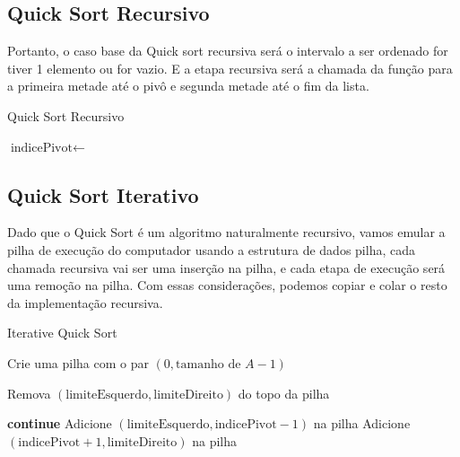 \subsection{Quick Sort Recursivo}

Portanto, o caso base da Quick sort recursiva será o intervalo a ser ordenado for tiver 1 elemento ou for vazio. E a etapa recursiva será a chamada da função para a primeira metade até o pivô e segunda metade até o fim da lista.

\begin{algorithm}
	\caption{Quick Sort Recursivo}
	\label{algo:rec_quick_sort}
	\begin{algorithmic}[1]
		\Return
		\EndIf
		\State $\text{indicePivot} \gets$ 
		\State {}
		\State {}
		\EndFunction
	\end{algorithmic}
\end{algorithm}
\FloatBarrier

\subsection{Quick Sort Iterativo}

Dado que o Quick Sort é um algoritmo naturalmente recursivo, vamos emular a pilha de execução do computador usando a estrutura de dados pilha, cada chamada recursiva vai ser uma inserção na pilha, e cada etapa de execução será uma remoção na pilha. Com essas considerações, podemos copiar e colar o resto da implementação recursiva.

\begin{algorithm}
	\caption{Iterative Quick Sort}
	\label{algo:iterative_quick_sort}
	\begin{algorithmic}[1]
		\Statex

		\State \Return
		\EndIf
		\State Crie uma pilha com o par $(0, \text{tamanho de } A - 1)$

		\State Remova $(\text{limiteEsquerdo}, \text{limiteDireito})$ do topo da pilha

		\State \textbf{continue}
		\EndIf
		\State Adicione $(\text{limiteEsquerdo}, \text{indicePivot} - 1)$ na pilha 
		\State Adicione $(\text{indicePivot} + 1, \text{limiteDireito})$ na pilha 
		\EndWhile
		\EndFunction
	\end{algorithmic}
\end{algorithm}
\FloatBarrier
\newpage

